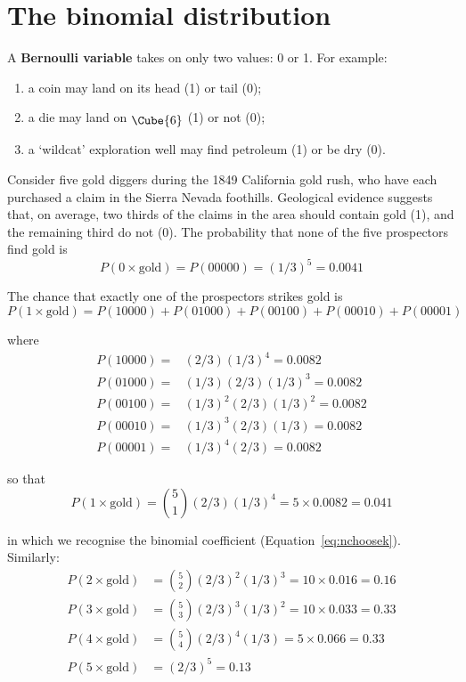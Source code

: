\chapter{The binomial distribution}
\label{ch:binomial}

A \textbf{Bernoulli variable} takes on only two values: 0 or 1. For
example:

\begin{enumerate}
\item a coin may land on its head (1) or tail (0);
\item a die may land on $\raisebox{-2pt}{\Cube{6}}$ (1) or not (0);
\item a `wildcat' exploration well may find petroleum (1) or be dry (0).
\end{enumerate}

Consider five gold diggers during the 1849 California gold rush, who
have each purchased a claim in the Sierra Nevada foothills. Geological
evidence suggests that, on average, two thirds of the claims in the
area should contain gold (1), and the remaining third do not (0). The
probability that none of the five prospectors find gold is
\[
P(0\times\mbox{gold}) = P(00000) = (1/3)^5 = 0.0041
\]

The chance that exactly one of the prospectors strikes gold is
\[
P(1\times\mbox{gold}) = P(10000) + P(01000) + P(00100) + P(00010) + P(00001)
\]

\noindent where
\begin{align*}
  P(10000) = & (2/3) (1/3)^4 = 0.0082 \\
  P(01000) = & (1/3) (2/3) (1/3)^3 = 0.0082 \\
  P(00100) = & (1/3)^2 (2/3) (1/3)^2 = 0.0082 \\
  P(00010) = & (1/3)^3 (2/3) (1/3) = 0.0082 \\
  P(00001) = & (1/3)^4 (2/3) = 0.0082
\end{align*}

\noindent so that
\[
P(1\times\mbox{gold}) = \binom{5}{1} (2/3) (1/3)^4 = {5}\times{0.0082} = 0.041
\]

\noindent in which we recognise the binomial coefficient
(Equation~\ref{eq:nchoosek}). Similarly:
\begin{align*}
P(2\times\mbox{gold}) & = \binom{5}{2} (2/3)^2 (1/3)^3 = {10}\times{0.016} = 0.16\\
P(3\times\mbox{gold}) & = \binom{5}{3} (2/3)^3 (1/3)^2 = {10}\times{0.033} = 0.33\\
P(4\times\mbox{gold}) & = \binom{5}{4} (2/3)^4 (1/3) = {5}\times{0.066} = 0.33\\
P(5\times\mbox{gold}) & = (2/3)^5 = 0.13
\end{align*}

